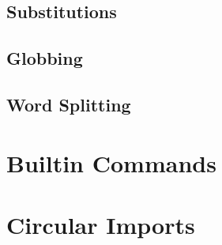 \subsection{Substitutions}
\subsection{Globbing}
\subsection{Word Splitting}

\section{Builtin Commands}

\section{Circular Imports}




